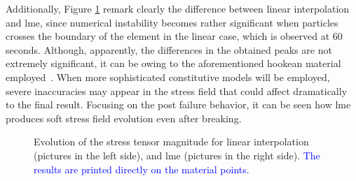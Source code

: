 \documentclass[preprint,12pt,a4paper]{elsarticle}
\begin{document}
Additionally, Figure \ref{fig:Stress-cracked-panel-mode-I}
remark clearly the difference between linear interpolation and
\acrshort{lme}, since numerical instability becomes rather significant
when particles crosses the boundary of the element in the linear
case, which is observed at 60 seconds. Although, apparently, the
differences in the obtained peaks are not extremely significant, it
can be owing to the aforementioned hookean material
employed~\cite{Zhang_EE_2020}. When more sophisticated constitutive
models will be employed, severe inaccuracies may appear in the
stress field that could affect dramatically to the final 
result. Focusing on the post failure behavior, it can be seen how
\acrshort{lme} produces soft stress field evolution even after
breaking. 
\begin{figure}
\centering
{}
\caption{Evolution of the stress tensor magnitude for linear
  interpolation (pictures in the left side), and \acrshort{lme}
  (pictures in the right side).  \textcolor{blue}{The results are printed directly on the material points.}}
\label{fig:Stress-cracked-panel-mode-I}
\end{figure}
\end{document}
